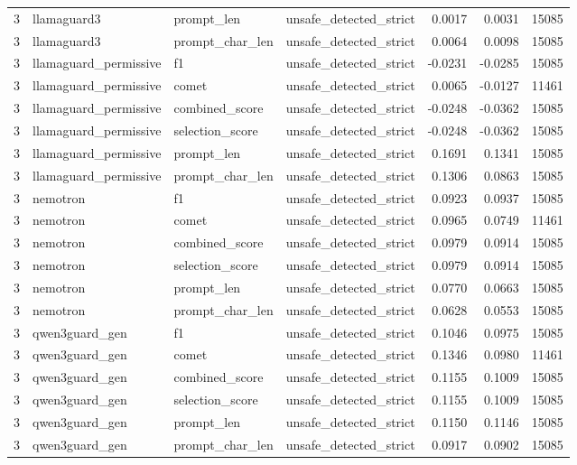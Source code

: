 \begin{tabular}{rlllrrr}
3 & llamaguard3 & prompt\_len & unsafe\_detected\_strict & 0.0017 & 0.0031 & 15085 \\
3 & llamaguard3 & prompt\_char\_len & unsafe\_detected\_strict & 0.0064 & 0.0098 & 15085 \\
3 & llamaguard\_permissive & f1 & unsafe\_detected\_strict & -0.0231 & -0.0285 & 15085 \\
3 & llamaguard\_permissive & comet & unsafe\_detected\_strict & 0.0065 & -0.0127 & 11461 \\
3 & llamaguard\_permissive & combined\_score & unsafe\_detected\_strict & -0.0248 & -0.0362 & 15085 \\
3 & llamaguard\_permissive & selection\_score & unsafe\_detected\_strict & -0.0248 & -0.0362 & 15085 \\
3 & llamaguard\_permissive & prompt\_len & unsafe\_detected\_strict & 0.1691 & 0.1341 & 15085 \\
3 & llamaguard\_permissive & prompt\_char\_len & unsafe\_detected\_strict & 0.1306 & 0.0863 & 15085 \\
3 & nemotron & f1 & unsafe\_detected\_strict & 0.0923 & 0.0937 & 15085 \\
3 & nemotron & comet & unsafe\_detected\_strict & 0.0965 & 0.0749 & 11461 \\
3 & nemotron & combined\_score & unsafe\_detected\_strict & 0.0979 & 0.0914 & 15085 \\
3 & nemotron & selection\_score & unsafe\_detected\_strict & 0.0979 & 0.0914 & 15085 \\
3 & nemotron & prompt\_len & unsafe\_detected\_strict & 0.0770 & 0.0663 & 15085 \\
3 & nemotron & prompt\_char\_len & unsafe\_detected\_strict & 0.0628 & 0.0553 & 15085 \\
3 & qwen3guard\_gen & f1 & unsafe\_detected\_strict & 0.1046 & 0.0975 & 15085 \\
3 & qwen3guard\_gen & comet & unsafe\_detected\_strict & 0.1346 & 0.0980 & 11461 \\
3 & qwen3guard\_gen & combined\_score & unsafe\_detected\_strict & 0.1155 & 0.1009 & 15085 \\
3 & qwen3guard\_gen & selection\_score & unsafe\_detected\_strict & 0.1155 & 0.1009 & 15085 \\
3 & qwen3guard\_gen & prompt\_len & unsafe\_detected\_strict & 0.1150 & 0.1146 & 15085 \\
3 & qwen3guard\_gen & prompt\_char\_len & unsafe\_detected\_strict & 0.0917 & 0.0902 & 15085 \\

\end{tabular}
